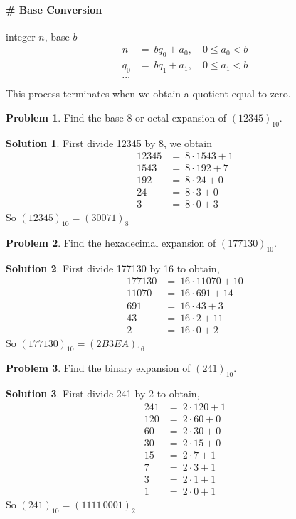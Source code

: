 \documentclass[12pt,oneside,a4paper]{book}
\theoremstyle{remark}
\theoremstyle{definition}
\newtheorem{prob}{Problem}[section]
\newtheorem*{soln}{Solution}
\begin{document}
\paragraph{\# Base Conversion} integer $ n $, base $ b $
\begin{align*}
    n      & =\ bq_0+a_0,\quad 0\leq a_0<b \\
    q_0    & =\ bq_1+a_1,\quad 0\leq a_1<b \\
    \cdots &                               \\
\end{align*}
This process terminates when we obtain a quotient equal to zero.
\begin{prob}
    Find the base 8 or octal expansion of \((12345)_{10}\).
\end{prob}
\begin{soln}
    First divide 12345 by 8, we obtain
    \begin{align*}
        12345 & =\ 8\cdot1543+1 \\
        1543  & =\ 8\cdot 192+7 \\
        192   & =\ 8\cdot24+0   \\
        24    & =\ 8\cdot3+0    \\
        3     & =\ 8\cdot0+3
    \end{align*}
    So \((12345)_{10}=(30071)_8\)
\end{soln}
\begin{prob}
    Find the hexadecimal expansion of \((177130)_{10}\).
\end{prob}
\begin{soln}
    First divide 177130 by 16 to obtain,
    \begin{align*}
        177130 & =\ 16\cdot11070+10 \\
        11070  & =\ 16\cdot691+14   \\
        691    & =\ 16\cdot43+3     \\
        43     & =\ 16\cdot2+11     \\
        2      & =\ 16\cdot0+2
    \end{align*}
    So \((177130)_{10}=(2B3EA)_{16}\)
\end{soln}
\begin{prob}
    Find the binary expansion of \((241)_{10}\).
\end{prob}
\begin{soln}
    First divide 241 by 2 to obtain,
    \begin{align*}
        241 & =\ 2\cdot120+1 \\
        120 & =\ 2\cdot60+0  \\
        60  & =\ 2\cdot30+0  \\
        30  & =\ 2\cdot15+0  \\
        15  & =\ 2\cdot7+1   \\
        7   & =\ 2\cdot3+1   \\
        3   & =\ 2\cdot1+1   \\
        1   & =\ 2\cdot0+1
    \end{align*}
    So \((241)_{10}=(1111\,0001)_{2}\)
\end{soln}
\end{document}
